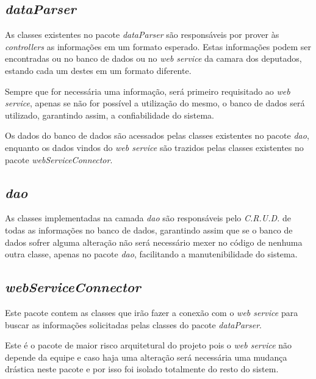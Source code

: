 \subsection{\textit{dataParser}}

	As classes existentes no pacote \textit{dataParser} são responsáveis por prover às \textit{controllers} as informações em um formato esperado. Estas informações podem ser encontradas ou no banco de dados ou no \textit{web service} da camara dos deputados, estando cada um destes em um formato diferente.

	Sempre que for necessária uma informação, será primeiro requisitado ao \textit{web service}, apenas se não for possível a utilização do mesmo, o banco de dados será utilizado, garantindo assim, a confiabilidade do sistema.

	Os dados do banco de dados são acessados pelas classes existentes no pacote \textit{dao}, enquanto os dados vindos do \textit{web service} são trazidos pelas classes existentes no pacote \textit{webServiceConnector}.

\subsection{\textit{dao}}

	As classes implementadas na camada \textit{dao} são responsáveis pelo \textit{C.R.U.D.} de todas as informações no banco de dados, garantindo assim que se o banco de dados sofrer alguma alteração não será necessário mexer no código de nenhuma outra classe, apenas no pacote \textit{dao}, facilitando a manutenibilidade do sistema.

\subsection{\textit{webServiceConnector}} 

	Este pacote contem as classes que irão fazer a conexão com o \textit{web service} para buscar as informações solicitadas pelas classes do pacote \textit{dataParser}.

	Este é o pacote de maior risco arquitetural do projeto pois o \textit{web service} não depende da equipe e caso haja uma alteração será necessária uma mudança drástica neste pacote e por isso foi isolado totalmente do resto do sistem.
